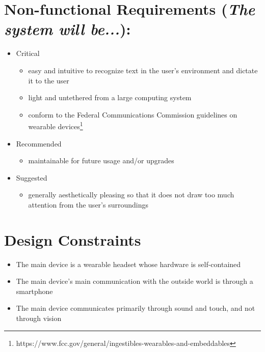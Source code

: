 \section{Non-functional Requirements (\textit{The system will be...}):}
\begin{itemize}
\item Critical
	\begin{itemize}
	\item easy and intuitive to recognize text in the user’s environment and dictate it to the user
	\item light and untethered from a large computing system
	\item conform to the Federal Communications Commission guidelines on wearable devices\footnote{https://www.fcc.gov/general/ingestibles-wearables-and-embeddables}
    \end{itemize}
\item Recommended
	\begin{itemize}
	\item maintainable for future usage and/or upgrades
	\end{itemize}
\item Suggested
    \begin{itemize}
	\item generally aesthetically pleasing so that it does not draw too much attention from the user’s surroundings
	\end{itemize}
\end{itemize}

\section{Design Constraints}
\begin{itemize}
\item The main device is a wearable headset whose hardware is self-contained
\item The main device’s main communication with the outside world is through a smartphone
\item The main device communicates primarily through sound and touch, and not through vision
\end{itemize}